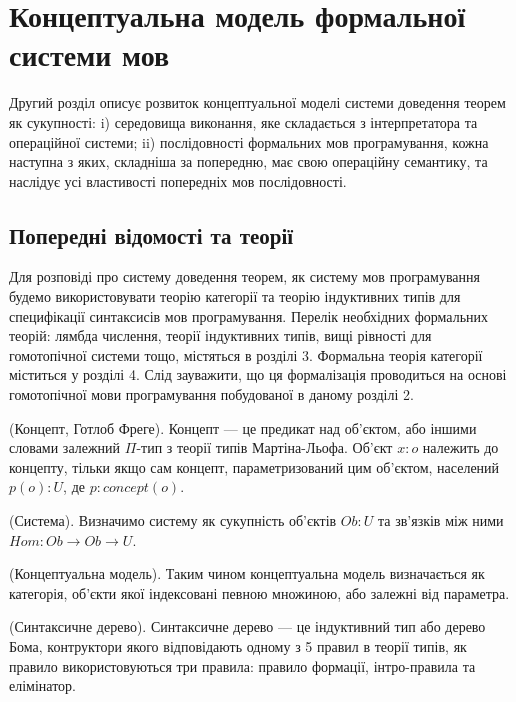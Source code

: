 
\chapter{Концептуальна модель формальної системи мов}
Другий розділ описує розвиток концептуальної моделі системи доведення теорем як сукупності:
i) середовища виконання, яке складається з інтерпретатора та операційної системи;
ii) послідовності формальних мов програмування,
кожна наступна з яких, складніша за попередню,
має свою операційну семантику, та наслідує усі властивості
попередніх мов послідовності.

\section{Попередні відомості та теорії}
Для розповіді про систему доведення теорем, як систему мов програмування
будемо використовувати теорію категорії та теорію індуктивних
типів для специфікації синтаксисів мов програмування. Перелік необхідних формальних теорій:
лямбда числення, теорії індуктивних типів, вищі рівності для гомотопічної системи
тощо, містяться в розділі 3. Формальна теорія категорії міститься у розділі 4.
Слід зауважити, що ця формалізація проводиться на основі гомотопічної
мови програмування побудованої в даному розділі 2.

\begin{definition} (Концепт, Готлоб Фреге).
Концепт --- це предикат над об'єктом,
або іншими словами залежний $\Pi$-тип з теорії типів Мартіна-Льофа.
Об'єкт $x : o$ належить до концепту, тільки якщо сам концепт,
параметризований цим об'єктом, населений $p(o) : U$, де $p : concept(o)$.
\end{definition}

\begin{definition} (Система).
Визначимо систему як сукупність об'єктів $Ob : U$
та зв'язків між ними $Hom : Ob \rightarrow Ob \rightarrow U$.
\end{definition}

\begin{definition} (Концептуальна модель).
Таким чином концептуальна модель визначається як категорія, об'єкти якої
індексовані певною множиною, або залежні від параметра.
\end{definition}

\begin{definition} (Синтаксичне дерево).
Синтаксичне дерево --- це індуктивний тип або дерево Бома,
контруктори якого відповідають одному з 5 правил в теорії типів,
як правило використовуються три правила: правило формації, інтро-правила та елімінатор.
\end{definition}

